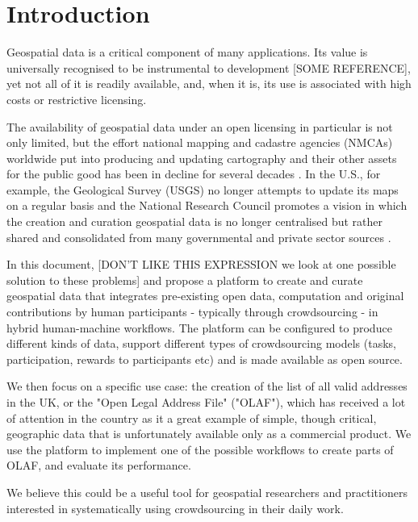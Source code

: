\section{Introduction}

Geospatial data is a critical component of many applications. Its value is universally recognised to be instrumental to development [SOME REFERENCE], yet not all of it is readily available, and, when it is, its use is associated with high costs or restrictive licensing. 

The availability of geospatial data under an open licensing in particular is not only limited, but the effort national mapping and cadastre agencies (NMCAs) worldwide put into producing and updating cartography and their other assets for the public good has been in decline for several decades \cite{ESTES:1994vz}. In the U.S., for example, the Geological Survey (USGS) no longer attempts to update its maps on a regular basis and the National Research Council promotes a vision in which the creation and curation geospatial data is no longer centralised but rather shared and consolidated from many governmental and private sector sources \cite{Committee:1993vp}.

In this document, [DON'T LIKE THIS EXPRESSION we look at one possible solution to these problems] and propose a platform to create and curate geospatial data that integrates pre-existing open data, computation and original contributions by human participants - typically through crowdsourcing - in hybrid human-machine workflows. The platform can be configured to produce different kinds of data, support different types of crowdsourcing models (tasks, participation, rewards to participants etc) and is made available as open source.

We then focus on a specific use case: the creation of the list of all valid addresses in the UK, or the "Open Legal Address File" ("OLAF"), which has received a lot of attention in the country as it a great example of simple, though critical, geographic data that is unfortunately available only as a commercial product. We use the platform to implement one of the possible workflows to create parts of OLAF, and evaluate its performance. 

We believe this could be a useful tool for geospatial researchers and practitioners interested in systematically using crowdsourcing in their daily work.
